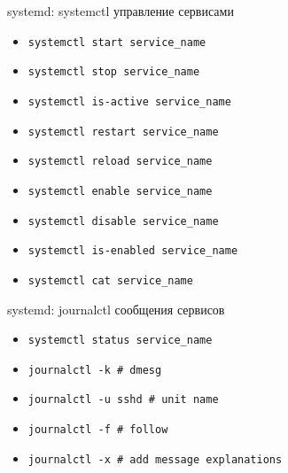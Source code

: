 \begin{frame}{systemd: systemctl управление сервисами}
		\begin{itemize}
			\item {\tt systemctl start service\_name}
			\item {\tt systemctl stop service\_name}
			\item {\tt systemctl is-active service\_name}
			\item {\tt systemctl restart service\_name}
			\item {\tt systemctl reload service\_name}
			\item {\tt systemctl enable service\_name}
			\item {\tt systemctl disable service\_name}
			\item {\tt systemctl is-enabled service\_name}
			\item {\tt systemctl cat service\_name}
		\end{itemize}
\end{frame}

\begin{frame}{systemd: journalctl сообщения сервисов}
		\begin{itemize}
			\item {\tt systemctl status service\_name}
			\item {\tt journalctl -k 		\# dmesg }
			\item {\tt journalctl -u sshd  \# unit name }
			\item {\tt journalctl -f  		\# follow }
			\item {\tt journalctl -x  		\# add message explanations }
		\end{itemize}
\end{frame}

